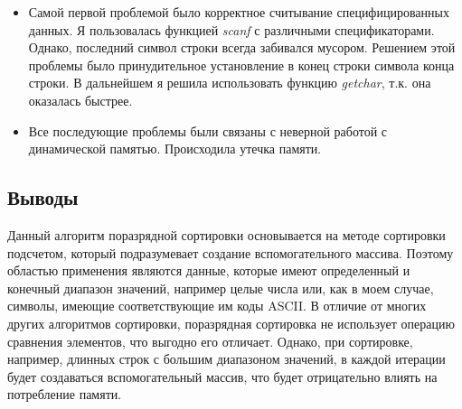 \documentclass[12pt]{article}
\begin{document}
\begin{itemize}
    \item Самой первой проблемой было корректное считывание специфицированных данных. Я пользовалась функцией {\it scanf} с различными спецификаторами. Однако, последний символ строки всегда забивался мусором. Решением этой проблемы было принудительное установление в конец строки символа конца строки. В дальнейшем я решила использовать функцию {\it getchar}, т.к. она оказалась быстрее.
    \item Все последующие проблемы были связаны с неверной работой с динамической памятью. Происходила утечка памяти.
\end{itemize}

\subsection*{Выводы}

Данный алгоритм поразрядной сортировки основывается на методе сортировки подсчетом, который подразумевает создание вспомогательного массива. Поэтому областью применения являются данные, которые имеют определенный и конечный диапазон значений, например целые числа или, как в моем случае, символы, имеющие соответствующие им коды ASCII. В отличие от многих других алгоритмов сортировки, поразрядная сортировка не использует операцию сравнения элементов, что выгодно его отличает. Однако, при сортировке, например, длинных строк с большим диапазоном значений, в каждой итерации будет создаваться вспомогательный массив, что будет отрицательно влиять на потребление памяти. 
\end{document}
